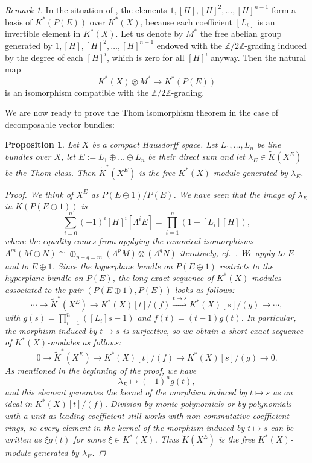 \documentclass[12pt,a4paper]{amsart}
\theoremstyle{plain}
\newtheorem{prop}[thm]{Proposition}
\theoremstyle{definition}
\theoremstyle{remark}
\newtheorem{rem}[thm]{Remark}
\begin{document}
\begin{rem}\label{rem:free}
  In the situation of , the elements $1, [H], [H]^{2}, \ldots, [H]^{n-1}$ form a basis of $K^{*}(P(E))$ over $K^{*}(X)$, because each coefficient $[L_{i}]$ is an invertible element in $K^{*}(X)$.
  Let us denote by $M^{*}$ the free abelian group generated by $1, [H], [H]^{2}, \ldots, [H]^{n-1}$ endowed with the $\mathbb{Z}/2\mathbb{Z}$-grading induced by the degree of each $[H]^{i}$, which is zero for all $[H]^{i}$ anyway.
  Then the natural map
  \[ K^{*}(X) \otimes M^{*} \to K^{*}(P(E)) \]
  is an isomorphism compatible with the $\mathbb{Z}/2\mathbb{Z}$-grading.
\end{rem}

We are now ready to prove the Thom isomorphism theorem in the case of decomposable vector bundles:

\begin{prop}\label{prop:sumthom}
  Let $X$ be a compact Hausdorff space.
  Let $L_{1}, \ldots, L_{n}$ be line bundles over $X$, let $E := L_{1} \oplus \ldots \oplus L_{n}$ be their direct sum and let $\lambda_{E} \in \tilde{K}(X^{E})$ be the Thom class.
  Then $\tilde{K}^{*}(X^{E})$ is the free $K^{*}(X)$-module generated by $\lambda_{E}$.
  \begin{proof}
    We think of $X^{E}$ as $P(E \oplus 1)/P(E)$.
    We have seen that the image of $\lambda_{E}$ in $K(P(E\oplus 1))$ is
    \[ \sum_{i=0}^{n} (-1)^{i}[H]^{i}[\Lambda^{i}E] = \prod_{i=1}^{n}(1 - [L_{i}][H]), \]
    where the equality comes from applying the canonical isomorphisms $\Lambda^{m}(M\oplus N) \cong \oplus_{p+q = m} (\Lambda^{p}M )\otimes (\Lambda^{q}N)$ iteratively, cf.~\cite[p.~42]{wir12}.
    We apply  to $E$ and to $E \oplus 1$.
    Since the hyperplane bundle on $P(E \oplus 1)$ restricts to the hyperplane bundle on $P(E)$, the long exact sequence of $K^{*}(X)$-modules associated to the pair $(P(E \oplus 1), P(E))$ looks as follows:
    \[ \cdots \to \tilde{K}^{*}(X^{E}) \to K^{*}(X)[t]/(f) \xrightarrow{t \mapsto s} K^{*}(X)[s]/(g) \to \cdots, \]
    with $g(s) = \prod_{i=1}^{n}([L_{i}]s -1)$ and $f(t) = (t-1)g(t)$.
    In particular, the morphism induced by $t \mapsto s$ is surjective, so we obtain a short exact sequence of $K^{*}(X)$-modules as follows:
    \[ 0 \to \tilde{K}^{*}(X^{E}) \to K^{*}(X)[t]/(f) \to K^{*}(X)[s]/(g) \to 0. \]
    As mentioned in the beginning of the proof, we have
    \[ \lambda_{E} \mapsto (-1)^{n}g(t), \]
    and this element generates the kernel of the morphism induced by $t \mapsto s$ as an ideal in $K^{*}(X)[t]/(f)$.
    Division by monic polynomials or by polynomials with a unit as leading coefficient still works with non-commutative coefficient rings, so every element in the kernel of the morphism induced by $t \mapsto s$ can be written as $\xi g(t)$ for some $\xi \in K^{*}(X)$.
    Thus $\tilde{K}(X^{E})$ is the free $K^{*}(X)$-module generated by $\lambda_{E}$.
  \end{proof}
\end{prop}
\end{document}
